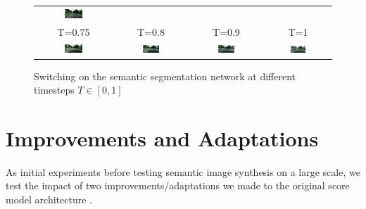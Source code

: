 \begin{figure}
\begin{tabular}{cccc}
        \includegraphics[width=0.25\textwidth]{Chapters/figures/experiments/seg_start/0_0.7_cond_sample.png}  \\
        T=0.75 & T=0.8 & T=0.9 & T=1  \\
        \includegraphics[width=0.25\textwidth]{Chapters/figures/experiments/seg_start/0_0.75_cond_sample.png} & 
        \includegraphics[width=0.25\textwidth]{Chapters/figures/experiments/seg_start/0_0.8_cond_sample.png} & 
        \includegraphics[width=0.25\textwidth]{Chapters/figures/experiments/seg_start/0_0.9_cond_sample.png} & 
        \includegraphics[width=0.25\textwidth]{Chapters/figures/experiments/seg_start/0_1.0_cond_sample.png}
    \end{tabular}
    \caption[Switching on the semantic segmentation network at different timesteps]{Switching on the semantic segmentation network at different timesteps $T\in[0,1]$}
\end{figure}
\section[Improvements and Adaptations]{Improvements and Adaptations%
    } \label{sec:5.3}
As initial experiments before testing semantic image synthesis on a large scale, we test the impact of two improvements/adaptations we made to the original score model architecture \cite{score_3}.
